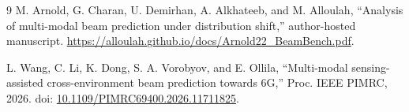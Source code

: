 \documentclass[10pt,journal,letterpaper]{IEEEtran}
\begin{document}
\begin{thebibliography}{9}
 M. Arnold, G. Charan, U. Demirhan, A. Alkhateeb, and M. Alloulah, ``Analysis of multi-modal beam prediction under distribution shift,'' author-hosted manuscript. \url{https://alloulah.github.io/docs/Arnold22_BeamBench.pdf}.

 L. Wang, C. Li, K. Dong, S. A. Vorobyov, and E. Ollila, ``Multi-modal sensing-assisted cross-environment beam prediction towards 6G,'' Proc. IEEE PIMRC, 2026. doi: \href{https://doi.org/10.1109/PIMRC69400.2026.11711825}{10.1109/PIMRC69400.2026.11711825}.

\end{thebibliography}
\end{document}
